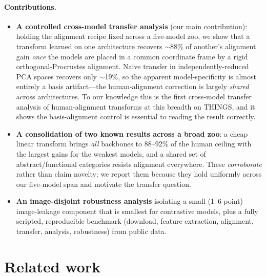 \documentclass{article}
\begin{document}
\paragraph{Contributions.}
\begin{itemize}
\item \textbf{A controlled cross-model transfer analysis} (our main contribution):
holding the alignment recipe fixed across a five-model zoo, we show that a transform
learned on one architecture recovers $\sim$88\% of another's alignment gain
\emph{once} the models are placed in a common coordinate frame by a rigid
orthogonal-Procrustes alignment. Naive transfer in independently-reduced PCA spaces
recovers only $\sim$19\%, so the apparent model-specificity is almost entirely a
basis artifact---the human-alignment correction is largely \emph{shared} across
architectures. To our knowledge this is the first cross-model transfer analysis of
human-alignment transforms at this breadth on THINGS, and it shows the
basis-alignment control is essential to reading the result correctly.
\item \textbf{A consolidation of two known results across a broad zoo}: a cheap
linear transform brings \emph{all} backbones to 88--92\% of the human ceiling with
the largest gains for the weakest models, and a shared set of abstract/functional
categories resists alignment everywhere. These \emph{corroborate}
\citet{muttenthaler2023human,muttenthaler2024aligning} rather than claim novelty; we
report them because they hold uniformly across our five-model span and motivate the
transfer question.
\item \textbf{An image-disjoint robustness analysis} isolating a small (1--6 point)
image-leakage component that is smallest for contrastive models, plus a fully
scripted, reproducible benchmark (download, feature extraction, alignment,
transfer, analysis, robustness) from public data.
\end{itemize}

\section{Related work}
\end{document}
